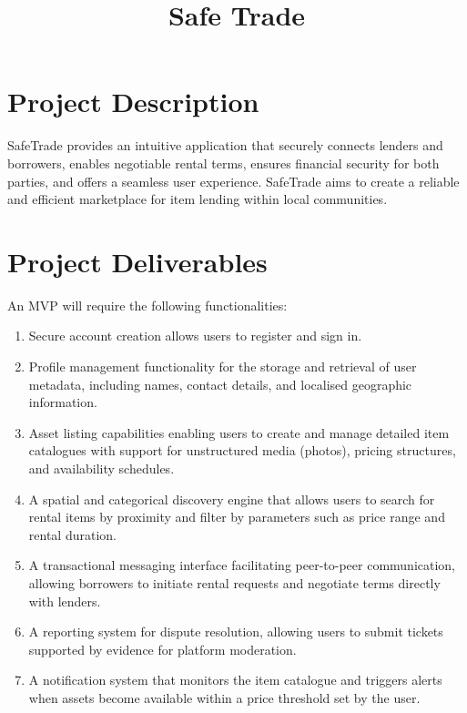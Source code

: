\title{Safe Trade}

\maketitle
\section*{Project Description}
SafeTrade provides an intuitive application that securely connects lenders and borrowers, enables negotiable rental terms, ensures financial security for both parties, and offers a seamless user experience. 
SafeTrade aims to create a reliable and efficient marketplace for item lending within local communities.

\section*{Project Deliverables}
An MVP will require the following functionalities:

\begin{enumerate}
\item Secure account creation allows users to register and sign in.
\item Profile management functionality for the storage and retrieval of user metadata, including names, contact details, and localised geographic information.
\item Asset listing capabilities enabling users to create and manage detailed item catalogues with support for unstructured media (photos), pricing structures, and availability schedules.
\item A spatial and categorical discovery engine that allows users to search for rental items by proximity and filter by parameters such as price range and rental duration.
\item A transactional messaging interface facilitating peer-to-peer communication, allowing borrowers to initiate rental requests and negotiate terms directly with lenders.
\item A reporting system for dispute resolution, allowing users to submit tickets supported by evidence for platform moderation.
\item A notification system that monitors the item catalogue and triggers alerts when assets become available within a price threshold set by the user.
\end{enumerate}

